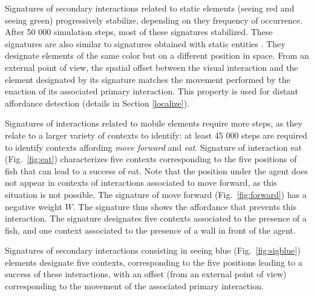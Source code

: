 \documentclass[conference]{IEEEtran}
\makeatletter
\let\cite\relax
\DeclareRobustCommand{\cite}{%
	\let\new@cite@pre\@gobble
	\@ifnextchar[\new@cite{\@citex[]}}
\def\new@cite[#1]{\@ifnextchar[{\new@citea{#1}}{\@citex[#1]}}
\def\new@citea#1{\def\new@cite@pre{#1}\@citex}
\makeatother
\begin{document}
Signatures of secondary interactions related to static elements (seeing red and seeing green) progressively stabilize, depending on they frequency of occurrence. After 50 000 simulation steps, most of these signatures stabilized. These signatures are also similar to signatures obtained with static entities \cite{gay:space}\cite{gay:dynamic}. They designate elements of the same color but on a different position in space. From an external point of view, the spatial offset between the visual interaction and the element designated by its signature matches the movement performed by the enaction of its associated primary interaction. This property is used for distant affordance detection \cite{gay:space} (details in Section \ref{localize}).


Signatures of interactions related to mobile elements require more steps, as they relate to a larger variety of contexts to identify: at least 45 000 steps are required to identify contexts affording \textit{move forward} and \textit{eat}. Signature of interaction eat (Fig.~\ref{fig:eat}) characterizes five contexts corresponding to the five positions of fish that can lead to a success of eat. Note that the position under the agent does not appear in contexts of interactions associated to move forward, as this situation is not possible. The signature of move forward (Fig.~\ref{fig:forward}) has a negative weight $W$. The signature thus shows the affordance that prevents this interaction. The signature designates five contexts associated to the presence of a fish, and one context associated to the presence of a wall in front of the agent.

Signatures of secondary interactions consisting in seeing blue (Fig.~\ref{fig:sigblue}) elements designate five contexts, corresponding to the five positions leading to a success of these interactions, with an offset (from an external point of view) corresponding to the movement of the associated primary interaction.
\end{document}
